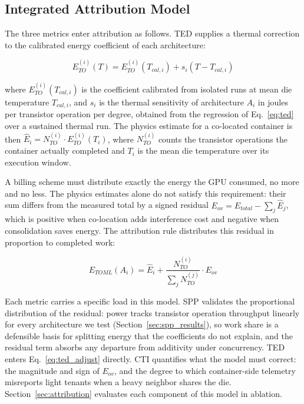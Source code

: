 \documentclass[conference]{IEEEtran}
\begin{document}
\subsection{Integrated Attribution Model}
\label{sec:model}

The three metrics enter attribution as follows. TED supplies a thermal correction to the calibrated energy coefficient of each architecture:

\begin{equation}
E_{TO}^{(i)}(T) = E_{TO}^{(i)}(T_{cal,i}) + s_i \left( T - T_{cal,i} \right)
\label{eq:ted_adjust}
\end{equation}

where $E_{TO}^{(i)}(T_{cal,i})$ is the coefficient calibrated from isolated runs at mean die temperature $T_{cal,i}$, and $s_i$ is the thermal sensitivity of architecture $A_i$ in joules per transistor operation per degree, obtained from the regression of Eq.~\ref{eq:ted} over a sustained thermal run. The physics estimate for a co-located container is then $\hat{E}_i = N_{TO}^{(i)} \cdot E_{TO}^{(i)}(T_i)$, where $N_{TO}^{(i)}$ counts the transistor operations the container actually completed and $T_i$ is the mean die temperature over its execution window.

A billing scheme must distribute exactly the energy the GPU consumed, no more and no less. The physics estimates alone do not satisfy this requirement: their sum differs from the measured total by a signed residual $E_{ov} = E_{total} - \sum_j \hat{E}_j$, which is positive when co-location adds interference cost and negative when consolidation saves energy. The attribution rule distributes this residual in proportion to completed work:

\begin{equation}
E_{TOML}(A_i) = \hat{E}_i + \frac{N_{TO}^{(i)}}{\sum_j N_{TO}^{(j)}} \cdot E_{ov}
\label{eq:toml_attribution}
\end{equation}

Each metric carries a specific load in this model. SPP validates the proportional distribution of the residual: power tracks transistor operation throughput linearly for every architecture we test (Section~\ref{sec:spp_results}), so work share is a defensible basis for splitting energy that the coefficients do not explain, and the residual term absorbs any departure from additivity under concurrency. TED enters Eq.~\ref{eq:ted_adjust} directly. CTI quantifies what the model must correct: the magnitude and sign of $E_{ov}$, and the degree to which container-side telemetry misreports light tenants when a heavy neighbor shares the die. Section~\ref{sec:attribution} evaluates each component of this model in ablation.
\end{document}
